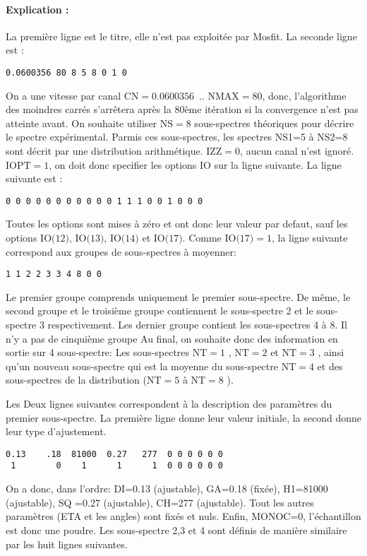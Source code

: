\paragraph{Explication :}
La première ligne est le titre, elle n'est pas exploitée par Mosfit. 
La seconde ligne est :
\begin{lstlisting}[frame=single]
0.0600356 80 8 5 8 0 1 0
\end{lstlisting}
On a une vitesse par canal $\text{CN}=0.0600356$~\milli\meter.\reciprocal\second.
$\text{NMAX}=80$, donc, l'algorithme des moindres carrés s'arrêtera après la 80ème itération si la convergence n'est pas atteinte avant.
On souhaite utiliser $\text{NS}=8$ sous-spectres théoriques pour décrire le spectre expérimental.
Parmis ces sous-spectres, les spectres NS1=5 à NS2=8 sont décrit par une distribution arithmétique.
$\text{IZZ}=0$, aucun canal n'est ignoré.$\text{IOPT}=1$, on doit donc specifier les options $\text{IO}$ sur la ligne suivante. La ligne suivante est :
\begin{lstlisting}[frame=single]
0 0 0 0 0 0 0 0 0 0 0 1 1 1 0 0 1 0 0 0
\end{lstlisting}
Toutes les options sont mises à zéro et ont donc leur valeur par defaut, sauf les options $\text{IO(12)}$, $\text{IO(13)}$, $\text{IO(14)}$ et $\text{IO(17)}$.
Comme $\text{IO(17)}=1$, la ligne suivante correspond aux groupes de sous-spectres à moyenner:
\begin{lstlisting}[frame=single]
1 1 2 2 3 3 4 8 0 0
\end{lstlisting}
Le premier groupe comprends uniquement le premier sous-spectre. De même, le second groupe et le troisième groupe contiennent le sous-spectre 2 et le sous-spectre 3 respectivement.
Les dernier groupe contient les sous-spectres 4 à 8. Il n'y a pas de cinquième groupe
Au final, on souhaite donc des information en sortie sur 4 sous-spectre: Les sous-spectres $\text{NT}=1$ , $\text{NT}=2$  et $\text{NT}=3$ ,  ainsi qu'un nouveau sous-spectre qui est la moyenne du sous-spectre $\text{NT}=4$  et des sous-spectres de la distribution ($\text{NT}=5$ à $\text{NT}=8$ ).

Les Deux lignes suivantes correspondent à la description des paramètres du premier sous-spectre.
La première ligne donne leur valeur initiale, la second donne leur type d'ajustement.
\begin{lstlisting}[frame=single]
0.13    .18  81000  0.27   277  0 0 0 0 0 0 
 1        0    1      1      1  0 0 0 0 0 0
\end{lstlisting}
On a donc, dans l'ordre: DI=0.13 (ajustable),  GA=0.18 (fixée), H1=81000 (ajustable), SQ =0.27 (ajustable), CH=277 (ajustable). Tout les autres paramètres (ETA et les angles) sont fixés et nuls.
 Enfin, MONOC=0, l'échantillon est donc une poudre.
Les sous-spectre 2,3 et 4 sont définis de manière similaire par les huit lignes suivantes.

